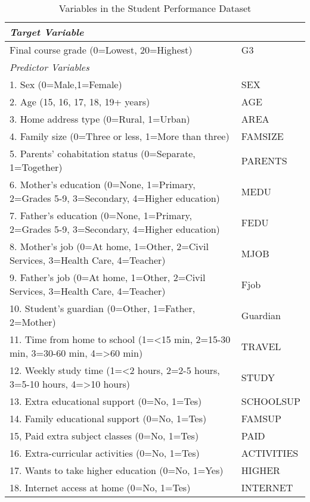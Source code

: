 \documentclass[sigconf]{acmart}
\begin{document}

\begin{table*}[ht]
  \caption{Variables in the Student Performance Dataset \cite{cortez08}}
  \label{tab:freq}
  \begin{tabular}{ll}
    \toprule
    \textit{Target Variable} &  \\
    \midrule
    Final course grade (0=Lowest, 20=Highest) & G3 \\
    \midrule
    \textit{Predictor Variables} &    \\
    \midrule
    1. Sex (0=Male,1=Female) & SEX  \\  
    2. Age (15, 16, 17, 18, 19+ years) & AGE  \\
    3. Home address type (0=Rural, 1=Urban) & AREA  \\
    4. Family size (0=Three or less, 1=More than three) & FAMSIZE  \\
    5. Parents' cohabitation status (0=Separate, 1=Together) & PARENTS  \\ 
    6. Mother's education (0=None, 1=Primary, 2=Grades 5-9,  3=Secondary, 4=Higher education) & MEDU  \\
    7. Father's education (0=None, 1=Primary, 2=Grades 5-9,  3=Secondary, 4=Higher education) & FEDU  \\
    8. Mother's job (0=At home, 1=Other, 2=Civil Services, 3=Health Care, 4=Teacher) & MJOB  \\
    9. Father's job (0=At home, 1=Other, 2=Civil Services, 3=Health Care, 4=Teacher) & Fjob  \\
    10. Student's guardian (0=Other, 1=Father, 2=Mother) & Guardian  \\
    11. Time from home to school (1=<15 min, 2=15-30 min, 3=30-60 min, 4=>60 min) & TRAVEL  \\
    12. Weekly study time (1=<2 hours, 2=2-5 hours, 3=5-10 hours, 4=>10 hours) & STUDY  \\
    13. Extra educational support (0=No, 1=Tes) & SCHOOLSUP  \\
    14. Family educational support (0=No, 1=Tes) & FAMSUP  \\
    15, Paid extra subject classes (0=No, 1=Tes) & PAID  \\
    16. Extra-curricular activities (0=No, 1=Tes) & ACTIVITIES  \\
    17. Wants to take higher education (0=No, 1=Yes) & HIGHER  \\
    18. Internet access at home (0=No, 1=Tes) & INTERNET  \\

\end{tabular}
\end{table*}
\end{document}
